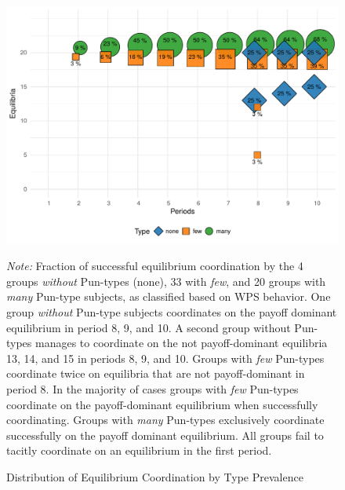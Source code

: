 \documentclass[11pt,a4paper]{article}
\begin{document}
\begin{refsection}
\begin{figure}[tbp]
  \centering
  \includegraphics[width=0.49\linewidth]{img/equi_bubble} 
  \caption[Distribution of Equilibria]{Distribution of Equilibrium Coordination by Type Prevalence}
  \label{fig:equibub}
  \smallskip
  \parbox{\linewidth}{\footnotesize\textit{Note:} Fraction of
    successful equilibrium coordination by the 4 groups \emph{without} Pun-types
    (none), 33
    with \emph{few}, and 20 groups with \emph{many} Pun-type subjects, as
    classified based on WPS behavior. One group \emph{without} Pun-type subjects
    coordinates on the payoff dominant equilibrium in period 8, 9, and 10. A
    second group without Pun-types manages to coordinate on the not
    payoff-dominant equilibria 13, 14, and 15 in periods 8, 9, and 10. Groups with \emph{few} Pun-types
    coordinate twice on equilibria that are not payoff-dominant in period 8. In the majority of cases groups with
    \emph{few} Pun-types coordinate on the payoff-dominant equilibrium when
    successfully coordinating. Groups with \emph{many} Pun-types exclusively
    coordinate successfully on the payoff dominant equilibrium. All groups fail
    to tacitly coordinate on an equilibrium in the first period.}

\end{figure} 


\end{refsection}
\end{document}
